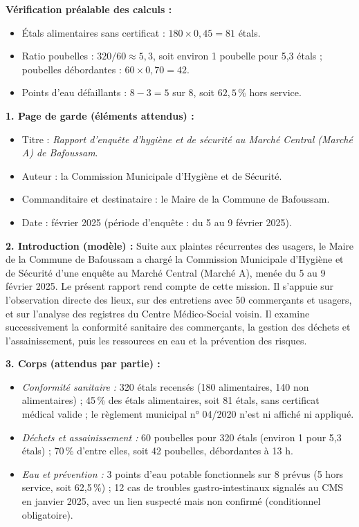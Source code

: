\documentclass[11pt]{article}
\begin{document}
\begin{corrige}
\textbf{Vérification préalable des calculs :}
\begin{itemize}
    \item Étals alimentaires sans certificat : $180 \times 0{,}45 = 81$ étals.
    \item Ratio poubelles : $320 / 60 \approx 5{,}3$, soit environ 1 poubelle pour 5,3 étals ; poubelles débordantes : $60 \times 0{,}70 = 42$.
    \item Points d'eau défaillants : $8 - 3 = 5$ sur 8, soit $62{,}5\,\%$ hors service.
\end{itemize}

\textbf{1. Page de garde (éléments attendus) :}
\begin{itemize}
    \item Titre : \emph{Rapport d'enquête d'hygiène et de sécurité au Marché Central (Marché A) de Bafoussam}.
    \item Auteur : la Commission Municipale d'Hygiène et de Sécurité.
    \item Commanditaire et destinataire : le Maire de la Commune de Bafoussam.
    \item Date : février 2025 (période d'enquête : du 5 au 9 février 2025).
\end{itemize}

\textbf{2. Introduction (modèle) :} Suite aux plaintes récurrentes des usagers, le Maire de la Commune de Bafoussam a chargé la Commission Municipale d'Hygiène et de Sécurité d'une enquête au Marché Central (Marché A), menée du 5 au 9 février 2025. Le présent rapport rend compte de cette mission. Il s'appuie sur l'observation directe des lieux, sur des entretiens avec 50 commerçants et usagers, et sur l'analyse des registres du Centre Médico-Social voisin. Il examine successivement la conformité sanitaire des commerçants, la gestion des déchets et l'assainissement, puis les ressources en eau et la prévention des risques.

\textbf{3. Corps (attendus par partie) :}
\begin{itemize}
    \item \emph{Conformité sanitaire :} 320 étals recensés (180 alimentaires, 140 non alimentaires) ; 45\,\% des étals alimentaires, soit 81 étals, sans certificat médical valide ; le règlement municipal n° 04/2020 n'est ni affiché ni appliqué.
    \item \emph{Déchets et assainissement :} 60 poubelles pour 320 étals (environ 1 pour 5,3 étals) ; 70\,\% d'entre elles, soit 42 poubelles, débordantes à 13 h.
    \item \emph{Eau et prévention :} 3 points d'eau potable fonctionnels sur 8 prévus (5 hors service, soit 62,5\,\%) ; 12 cas de troubles gastro-intestinaux signalés au CMS en janvier 2025, avec un lien suspecté mais non confirmé (conditionnel obligatoire).
\end{itemize}


\end{corrige}
\end{document}

